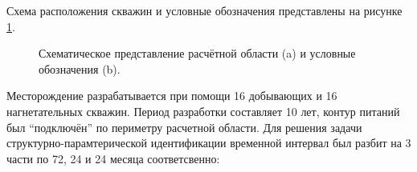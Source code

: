\documentclass{article}
\begin{document}
Схема расположения скважин и условные обозначения представлены на рисунке \ref{fig:map}. 
\begin{figure}
    \begin{minipage}[h]{0.69\linewidth}
    \end{minipage} \hfill
    \begin{minipage}[h]{0.29\linewidth}
    \end{minipage} 
    \caption{Схематическое представление расчётной области (a) и условные обозначения (b).}
    \label{fig:map}
\end{figure}
Месторождение разрабатывается при помощи 16 добывающих и 16 нагнетательных скважин. Период разработки составляет 10 лет, контур питаний был “подключён” по периметру расчетной области. Для решения задачи структурно-парамтерической идентификации временной интервал был разбит на 3 части по 72, 24 и 24 месяца соответсвенно:
\end{document}
